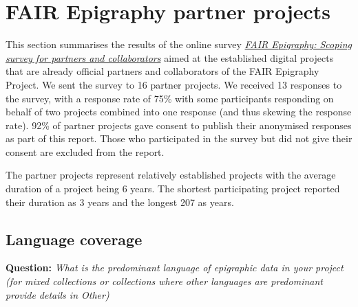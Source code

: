 \documentclass[
  10pt,
]{article}
\begin{document}
\hypertarget{fair-epigraphy-partner-projects}{%
\section{FAIR Epigraphy partner
projects}\label{fair-epigraphy-partner-projects}}

This section summarises the results of the online survey
\href{https://github.com/FAIR-epigraphy/scoping_survey_report/data/01_Survey_partners_questions.pdf}{\emph{FAIR
Epigraphy: Scoping survey for partners and collaborators}} aimed at the
established digital projects that are already official partners and
collaborators of the FAIR Epigraphy Project. We sent the survey to 16
partner projects. We received 13 responses to the survey, with a
response rate of 75\% with some participants responding on behalf of two
projects combined into one response (and thus skewing the response
rate). 92\% of partner projects gave consent to publish their anonymised
responses as part of this report. Those who participated in the survey
but did not give their consent are excluded from the report.

The partner projects represent relatively established projects with the
average duration of a project being 6 years. The shortest participating
project reported their duration as 3 years and the longest 207 as years.

\hypertarget{language-coverage}{%
\subsection{Language coverage}\label{language-coverage}}

\textbf{Question:} \emph{What is the predominant language of epigraphic
data in your project (for mixed collections or collections where other
languages are predominant provide details in Other)}
\end{document}
